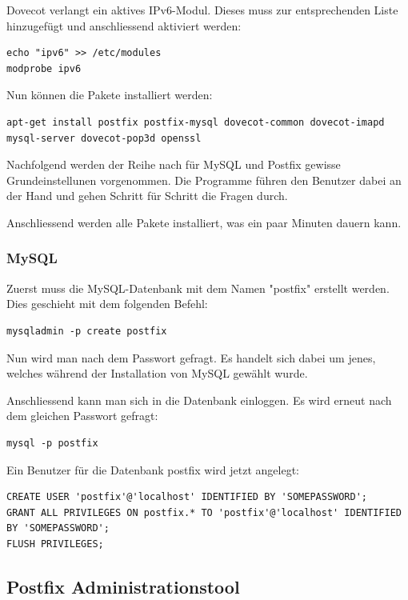 Dovecot verlangt ein aktives IPv6-Modul. Dieses muss zur entsprechenden Liste hinzugefügt und anschliessend aktiviert werden:

\begin{lstlisting}
echo "ipv6" >> /etc/modules
modprobe ipv6
\end{lstlisting}

Nun können die Pakete installiert werden:

\begin{lstlisting}
apt-get install postfix postfix-mysql dovecot-common dovecot-imapd mysql-server dovecot-pop3d openssl
\end{lstlisting}

Nachfolgend werden der Reihe nach für MySQL und Postfix gewisse Grundeinstellunen vorgenommen. Die Programme führen den Benutzer dabei an der Hand und gehen Schritt für Schritt die Fragen durch.


Anschliessend werden alle Pakete installiert, was ein paar Minuten dauern kann.

\subsubsection{MySQL}
Zuerst muss die MySQL-Datenbank mit dem Namen "postfix" erstellt werden. Dies geschieht mit dem folgenden Befehl:

\begin{lstlisting}
mysqladmin -p create postfix
\end{lstlisting}

Nun wird man nach dem Passwort gefragt. Es handelt sich dabei um jenes, welches während der Installation von MySQL gewählt wurde.

Anschliessend kann man sich in die Datenbank einloggen. Es wird erneut nach dem gleichen Passwort gefragt:

\begin{lstlisting}
mysql -p postfix
\end{lstlisting}

Ein Benutzer für die Datenbank postfix wird jetzt angelegt:

\begin{lstlisting}
CREATE USER 'postfix'@'localhost' IDENTIFIED BY 'SOMEPASSWORD';
GRANT ALL PRIVILEGES ON postfix.* TO 'postfix'@'localhost' IDENTIFIED BY 'SOMEPASSWORD';
FLUSH PRIVILEGES;
\end{lstlisting}

\subsection{Postfix Administrationstool}

